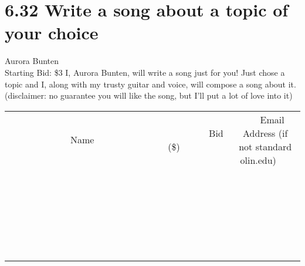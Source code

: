 \documentclass[11pt]{article}
\begin{document}
\section*{6.32 Write a song about a topic of your choice}
Aurora Bunten
\\
Starting Bid: \$3
\newline
I, Aurora Bunten, will write a song just for you! Just chose a topic and I, along with my trusty guitar and voice, will compose a song about it. (disclaimer: no guarantee you will like the song, but I'll put a lot of love into it)
\\[6ex]
\begin{tabular}{c c c}
~~~~~~~~~~~~~Name~~~~~~~~~~~~~ & ~~~~~~~~~Bid (\$)~~~~~~~~~  & ~~~Email Address (if not standard olin.edu)~~~\\
 & & \\
\hline
 & & \\
\hline
 & & \\
\hline
 & & \\
\hline
 & & \\
\hline
 & & \\
\hline
 & & \\
\hline
 & & \\
\hline
 & & \\
\hline
 & & \\
\hline
 & & \\
\hline
 & & \\
\hline
 & & \\
\hline
 & & \\
\hline
 & & \\
\hline
 & & \\
\hline
 & & \\
\hline
 & & \\
\hline
 & & \\
\hline
 & & \\
\hline
 & & \\
\hline
 & & \\
\hline
 & & \\
\hline
 & & \\
\hline
 & & \\
\hline
 & & \\
\hline
\end{tabular}
\newpage
\end{document}
